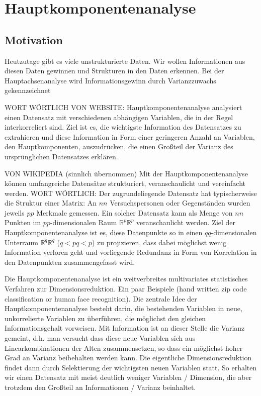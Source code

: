 \chapter{Hauptkomponentenanalyse}

\label{pca}

\section{Motivation}

Heutzutage gibt es viele unstrukturierte Daten. 
Wir wollen Informationen aus diesen Daten gewinnen und Strukturen in den Daten erkennen. Bei der Hauptachsenanalyse wird Informationsgewinn durch Varianzzuwachs gekennzeichnet

WORT WÖRTLICH VON WEBSITE: Hauptkomponentenanalyse analysiert einen Datensatz mit verschiedenen abhängigen Variablen, die in der Regel interkorreliert sind. Ziel ist es, die wichtigste Information des Datensatzes zu extrahieren und diese Information in Form einer geringeren Anzahl an Variablen, den Hauptkomponenten, auszudrücken, die einen Großteil der Varianz des ursprünglichen Datensatzes erklären.

VON WIKIPEDIA (sinnlich übernommen)
Mit der Hauptkomponentenanalyse können umfangreiche Datensätze strukturiert, veranschaulicht und vereinfacht werden.
WORT WÖRTLICH:
Der zugrundeliegende Datensatz hat typischerweise die Struktur einer Matrix: An ${\displaystyle n}n$ Versuchspersonen oder Gegenständen wurden jeweils ${\displaystyle p}p$ Merkmale gemessen. Ein solcher Datensatz kann als Menge von ${\displaystyle n}n$ Punkten im ${\displaystyle p}p$-dimensionalen Raum ${\displaystyle \mathbb {R} ^{p}}\mathbb {R} ^{p}$ veranschaulicht werden. Ziel der Hauptkomponentenanalyse ist es, diese Datenpunkte so in einen ${\displaystyle q}q$-dimensionalen Unterraum ${\displaystyle \mathbb {R} ^{q}}\mathbb {R} ^{q}$ (${\displaystyle q<p}q<p$) zu projizieren, dass dabei möglichst wenig Information verloren geht und vorliegende Redundanz in Form von Korrelation in den Datenpunkten zusammengefasst wird.

Die Hauptkomponentenanalyse ist ein weitverbreites multivariates statistisches Verfahren zur Dimensionsreduktion.
Ein paar Beispiele (hand written zip code classification or human face recognition).
Die zentrale Idee der Hauptkomponentenanalyse besteht darin, die bestehenden Variablen in neue, unkorrelierte Variablen zu überführen, die möglichst den gleichen Informationsgehalt vorweisen. Mit Information ist an dieser Stelle die Varianz gemeint, d.h. man versucht dass diese neue Variablen sich aus Linearkombinationen der Alten zusammensetzen, so dass ein möglichst hoher Grad an Varianz beibehalten werden kann. Die eigentliche Dimensionsreduktion findet dann durch Selektierung der wichtigsten neuen Variablen statt. So erhalten wir einen Datensatz mit meist deutlich weniger Variablen / Dimension, die aber trotzdem den Großteil an Informationen / Varianz beinhaltet.

